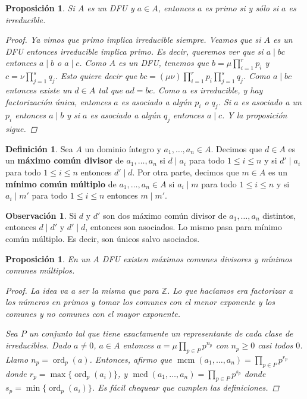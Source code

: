 \documentclass[12pt]{book}
\newtheorem{prop}[teo]{Proposición}
\theoremstyle{definition}
\newtheorem{obs}[teo]{Observación}
\newtheorem{defn}[teo]{Definición}
\newcommand{\ZZ}{\mathbb{Z}}      %
\DeclareMathOperator{\mcm}{mcm}
\DeclareMathOperator{\mcd}{mcd}
\DeclareMathOperator{\ord}{ord}
\begin{document}
\begin{prop}
Si $A$ es un DFU y $a\in A$, entonces $a$ es primo si y sólo si $a$ es irreducible.
\begin{proof}
Ya vimos que primo implica irreducible siempre. Veamos que si $A$ es un DFU entonces irreducible implica primo. Es decir, queremos ver que si $a\mid bc$ entonces $a\mid b$ o $a\mid c$. Como $A$ es un DFU, tenemos que $b=\mu \prod_{i=1}^r p_i$ y $c=\nu\prod_{j=1}^s q_j$. Esto quiere decir que $bc = (\mu\nu) \prod_{i=1}^r p_i \prod_{j=1}^s q_j$. Como $a\mid bc$ entonces existe un $d\in A$ tal que $ad=bc$. Como $a$ es irreducible, y hay factorización única, entonces $a$ es asociado a algún $p_i$ o $q_j$. Si $a$ es asociado a un $p_i$ entonces $a\mid b$ y si $a$ es asociado a algún $q_j$ entonces $a\mid c$. Y la proposición sigue.
\end{proof}
\end{prop}

\begin{defn}
Sea $A$ un dominio íntegro y $a_1,\ldots , a_n\in A$. Decimos que $d\in A$ es un \textbf{máximo común divisor} de $a_1,\ldots ,a_n$ si $d\mid a_i$ para todo $1\leq i\leq n$ y si $d'\mid a_i$ para todo $1\leq i\leq n$ entonces $d'\mid d$. Por otra parte, decimos que $m\in A$ es un \textbf{mínimo común múltiplo} de $a_1,\ldots , a_n\in A$ si $a_i\mid m$ para todo $1\leq i\leq n$ y si $a_i\mid m'$ para todo $1\leq i\leq n$ entonces $m\mid m'$.
\end{defn}

\begin{obs}
Si $d$ y $d'$ son dos máximo común divisor de $a_1,\ldots , a_n$ distintos, entonces $d\mid d'$ y $d'\mid d$, entonces son asociados. Lo mismo pasa para mínimo común múltiplo. Es decir, son únicos salvo asociados.
\end{obs}

\begin{prop}
En un $A$ DFU existen máximos comunes divisores y mínimos comunes múltiplos.
\begin{proof}
La idea va a ser la misma que para $\ZZ$. Lo que hacíamos era factorizar a los números en primos y tomar los comunes con el menor exponente y los comunes y no comunes con el mayor exponente.

Sea $P$ un conjunto tal que tiene exactamente un representante de cada clase de irreducibles. Dado $a\neq 0$, $a\in A$ entonces $a=\mu\prod_{p\in P} p^{n_p}$ con $n_p\geq 0$ casi todos $0$. Llamo $n_p=\ord_p(a)$. Entonces, afirmo que $\mcm (a_1,\ldots , a_n) = \prod_{p\in P}p^{r_p}$ donde $r_p=\max\{\ord_p(a_i)\}$, y $\mcd (a_1,\ldots ,a_n) = \prod_{p\in P}p^{s_p}$ donde $s_p=\min\{\ord_p(a_i)\}$. Es fácil chequear que cumplen las definiciones.
\end{proof}
\end{prop}
\end{document}

